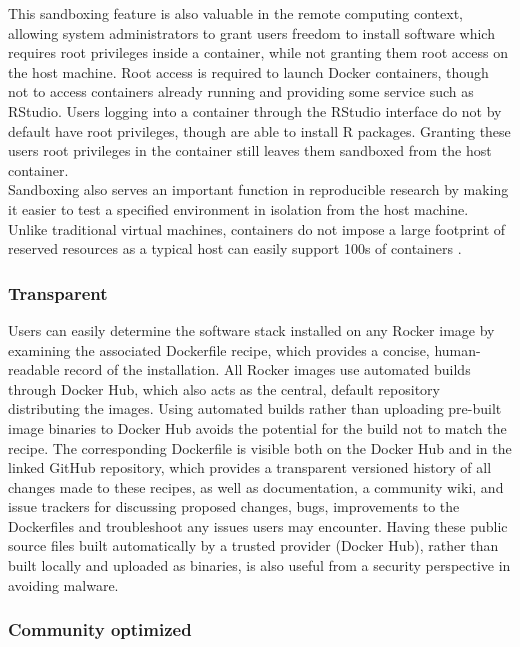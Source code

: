 This sandboxing feature is also valuable in the remote computing
context, allowing system administrators to grant users freedom to
install software which requires root privileges inside a container,
while not granting them root access on the host machine. Root access is
required to launch Docker containers, though not to access containers
already running and providing some service such as RStudio. Users
logging into a container through the
RStudio\textsuperscript{\textregistered} interface do not by default
have root privileges, though are able to install R packages. Granting
these users root privileges in the container still leaves them sandboxed
from the host container.\\
Sandboxing also serves an important function in reproducible research by
making it easier to test a specified environment in isolation from the
host machine. Unlike traditional virtual machines, containers do not
impose a large footprint of reserved resources as a typical host can
easily support 100s of containers \citep{what-docker}.

\subsubsection{Transparent}\label{transparent}

Users can easily determine the software stack installed on any Rocker
image by examining the associated Dockerfile recipe, which provides a
concise, human-readable record of the installation. All Rocker images
use automated builds through Docker Hub, which also acts as the central,
default repository distributing the images. Using automated builds
rather than uploading pre-built image binaries to Docker Hub avoids the
potential for the build not to match the recipe. The corresponding
Dockerfile is visible both on the Docker Hub and in the linked GitHub
repository, which provides a transparent versioned history of all
changes made to these recipes, as well as documentation, a community
wiki, and issue trackers for discussing proposed changes, bugs,
improvements to the Dockerfiles and troubleshoot any issues users may
encounter. Having these public source files built automatically by a
trusted provider (Docker Hub), rather than built locally and uploaded as
binaries, is also useful from a security perspective in avoiding
malware.

\subsubsection{Community optimized}\label{community-optimized}

